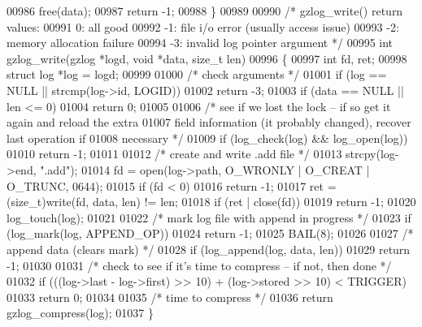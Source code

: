 \begin{DoxyCode}
{00986     free(data);
00987     \textcolor{keywordflow}{return} -1;
00988 \}
00989 
00990 \textcolor{comment}{/* gzlog\_write() return values:}
00991 \textcolor{comment}{    0: all good}
00992 \textcolor{comment}{   -1: file i/o error (usually access issue)}
00993 \textcolor{comment}{   -2: memory allocation failure}
00994 \textcolor{comment}{   -3: invalid log pointer argument */}
00995 \textcolor{keywordtype}{int} gzlog\_write(gzlog *logd, \textcolor{keywordtype}{void} *data, \textcolor{keywordtype}{size\_t} len)
00996 \{
00997     \textcolor{keywordtype}{int} fd, ret;
00998     \textcolor{keyword}{struct }log *log = logd;
00999 
01000     \textcolor{comment}{/* check arguments */}
01001     \textcolor{keywordflow}{if} (log == NULL || strcmp(log->id, LOGID))
01002         \textcolor{keywordflow}{return} -3;
01003     \textcolor{keywordflow}{if} (data == NULL || len <= 0)
01004         \textcolor{keywordflow}{return} 0;
01005 
01006     \textcolor{comment}{/* see if we lost the lock -- if so get it again and reload the extra}
01007 \textcolor{comment}{       field information (it probably changed), recover last operation if}
01008 \textcolor{comment}{       necessary */}
01009     \textcolor{keywordflow}{if} (log\_check(log) && log\_open(log))
01010         \textcolor{keywordflow}{return} -1;
01011 
01012     \textcolor{comment}{/* create and write .add file */}
01013     strcpy(log->end, \textcolor{stringliteral}{".add"});
01014     fd = open(log->path, O\_WRONLY | O\_CREAT | O\_TRUNC, 0644);
01015     \textcolor{keywordflow}{if} (fd < 0)
01016         \textcolor{keywordflow}{return} -1;
01017     ret = (size\_t)write(fd, data, len) != len;
01018     \textcolor{keywordflow}{if} (ret | close(fd))
01019         \textcolor{keywordflow}{return} -1;
01020     log\_touch(log);
01021 
01022     \textcolor{comment}{/* mark log file with append in progress */}
01023     \textcolor{keywordflow}{if} (log\_mark(log, APPEND\_OP))
01024         \textcolor{keywordflow}{return} -1;
01025     BAIL(8);
01026 
01027     \textcolor{comment}{/* append data (clears mark) */}
01028     \textcolor{keywordflow}{if} (log\_append(log, data, len))
01029         \textcolor{keywordflow}{return} -1;
01030 
01031     \textcolor{comment}{/* check to see if it's time to compress -- if not, then done */}
01032     \textcolor{keywordflow}{if} (((log->last - log->first) >> 10) + (log->stored >> 10) < TRIGGER)
01033         \textcolor{keywordflow}{return} 0;
01034 
01035     \textcolor{comment}{/* time to compress */}
01036     \textcolor{keywordflow}{return} gzlog\_compress(log);
01037 \}
}
\end{DoxyCode}
